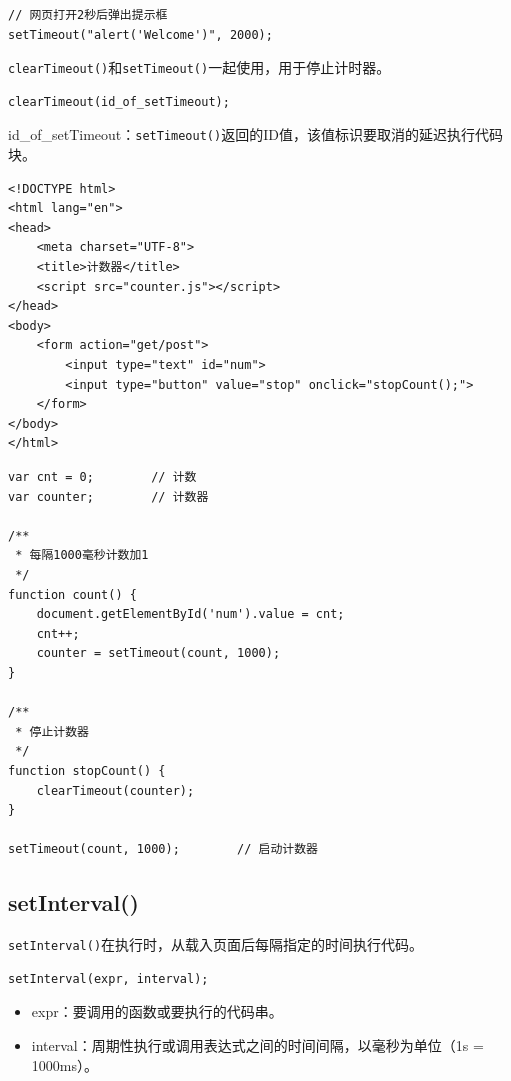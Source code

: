\begin{lstlisting}[style=htmlcssjs]
// 网页打开2秒后弹出提示框
setTimeout("alert('Welcome')", 2000);
\end{lstlisting}

\lstinline|clearTimeout()|和\lstinline|setTimeout()|一起使用，用于停止计时器。 \\

\begin{lstlisting}[style=htmlcssjs]
clearTimeout(id_of_setTimeout);
\end{lstlisting}

id\_of\_setTimeout：\lstinline|setTimeout()|返回的ID值，该值标识要取消的延迟执行代码块。 \\


\begin{lstlisting}[style=htmlcssjs, title=counter.html]
<!DOCTYPE html>
<html lang="en">
<head>
    <meta charset="UTF-8">
    <title>计数器</title>
    <script src="counter.js"></script>
</head>
<body>
    <form action="get/post">
        <input type="text" id="num">
        <input type="button" value="stop" onclick="stopCount();">
    </form>
</body>
</html>
\end{lstlisting}

\begin{lstlisting}[style=htmlcssjs, title=counter.js]
var cnt = 0;        // 计数
var counter;        // 计数器

/**
 * 每隔1000毫秒计数加1
 */
function count() {
    document.getElementById('num').value = cnt;
    cnt++;
    counter = setTimeout(count, 1000);
}

/**
 * 停止计数器
 */
function stopCount() {
    clearTimeout(counter);
}

setTimeout(count, 1000);        // 启动计数器
\end{lstlisting}

\subsection{setInterval()}

\lstinline|setInterval()|在执行时，从载入页面后每隔指定的时间执行代码。 \\

\begin{lstlisting}[style=htmlcssjs]
setInterval(expr, interval);
\end{lstlisting}

\begin{itemize}
	\item expr：要调用的函数或要执行的代码串。
	\item interval：周期性执行或调用表达式之间的时间间隔，以毫秒为单位（1s = 1000ms）。
\end{itemize}

